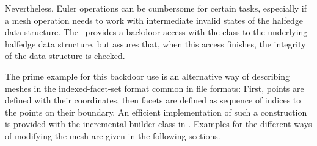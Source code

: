 Nevertheless, Euler operations can be cumbersome for certain tasks,
especially if a mesh operation needs to work with intermediate invalid
states of the halfedge data structure. The \cgalpoly\ provides a
backdoor access with the  class to the
underlying halfedge data structure, but assures that, when this access
finishes, the integrity of the data structure is checked.

The prime example for this backdoor use is an alternative way of
describing meshes in the indexed-facet-set format common in file
formats: First, points are defined with their coordinates, then facets
are defined as sequence of indices to the points on their boundary. An
efficient implementation of such a construction is provided with the
incremental builder class in \cgal. Examples for the different ways of
modifying the mesh are given in the following sections.









